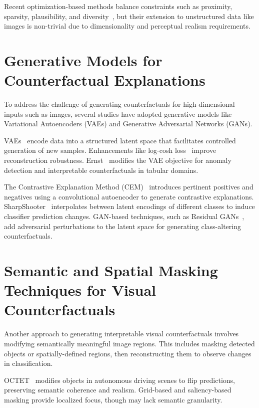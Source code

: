 Recent optimization-based methods balance constraints such as proximity, sparsity, plausibility, and diversity~\cite{NEURIPS2021_fd0a5a5e, delser2022tradeoff}, but their extension to unstructured data like images is non-trivial due to dimensionality and perceptual realism requirements.




\section{Generative Models for Counterfactual Explanations}

To address the challenge of generating counterfactuals for high-dimensional inputs such as images, several studies have adopted generative models like Variational Autoencoders (VAEs) and Generative Adversarial Networks (GANs).

VAEs~\cite{Kingma_2019} encode data into a structured latent space that facilitates controlled generation of new samples. Enhancements like log-cosh loss~\cite{chen2019log} improve reconstruction robustness. Ernst~\cite{ernst2024counterfactual} modifies the VAE objective for anomaly detection and interpretable counterfactuals in tabular domains.

The Contrastive Explanation Method (CEM)~\cite{DBLP:journals/corr/abs-1802-07623} introduces pertinent positives and negatives using a convolutional autoencoder to generate contrastive explanations. SharpShooter~\cite{barr2021counterfactualexplanationslatentspace} interpolates between latent encodings of different classes to induce classifier prediction changes. GAN-based techniques, such as Residual GANs~\cite{nemirovsky2021countergangeneratingrealisticcounterfactuals}, add adversarial perturbations to the latent space for generating class-altering counterfactuals.


\section{Semantic and Spatial Masking Techniques for Visual Counterfactuals}
Another approach to generating interpretable visual counterfactuals involves modifying semantically meaningful image regions. This includes masking detected objects or spatially-defined regions, then reconstructing them to observe changes in classification.

OCTET~\cite{zemni2023octetobjectawarecounterfactualexplanations} modifies objects in autonomous driving scenes to flip predictions, preserving semantic coherence and realism. Grid-based and saliency-based masking provide localized focus, though may lack semantic granularity.

